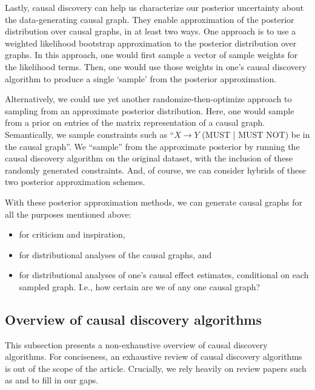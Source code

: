 Lastly, causal discovery can help us characterize our posterior uncertainty about the data-generating causal graph.
They enable approximation of the posterior distribution over causal graphs, in at least two ways.
One approach is to use a weighted likelihood bootstrap approximation \citep{newton_1994_approximate} to the posterior distribution over graphs.
In this approach, one would first sample a vector of sample weights for the likelihood terms.
Then, one would use those weights in one's causal discovery algorithm to produce a single `sample' from the posterior approximation.

Alternatively, we could use yet another randomize-then-optimize \citep{bardsley_2014_randomize, orabona_2014_measure} approach to sampling from an approximate posterior distribution.
Here, one would sample from a prior on entries of the matrix representation of a causal graph.
Semantically, we sample constraints such as ``$X \rightarrow Y$ (MUST | MUST NOT) be in the causal graph''.
We ``sample'' from the approximate posterior by running the causal discovery algorithm on the original dataset, with the inclusion of these randomly generated constraints.
And, of course, we can consider hybrids of these two posterior approximation schemes.

With these posterior approximation methods, we can generate causal graphs for all the purposes mentioned above:
\begin{itemize}
   \item for criticism and inspiration,
   \item for distributional analyses of the causal graphs, and
   \item for distributional analyses of one's causal effect estimates, conditional on each sampled graph.\newline
   I.e., how certain are we of any one causal graph?
\end{itemize}

\subsection{Overview of causal discovery algorithms}
\label{sec:discovery-overview}

This subsection presents a non-exhaustive overview of causal discovery algorithms.
For conciseness, an exhaustive review of causal discovery algorithms is out of the scope of the article.
Crucially, we rely heavily on review papers such as \citet{glymour_2019_review} and \citet{spirtes_2016_causal} to fill in our gaps.


